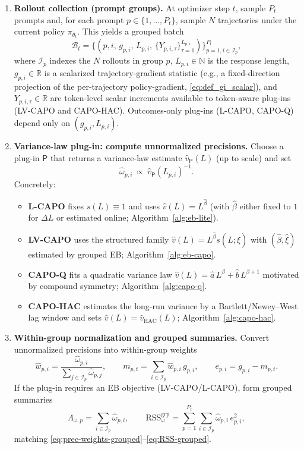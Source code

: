 \begin{enumerate}
  \item \textbf{Rollout collection (prompt groups).} At optimizer step $t$, sample $P_t$ prompts and, for each prompt $p\in\{1,\dots,P_t\}$, sample $N$ trajectories under the current policy $\pi_{\theta_t}$. This yields a grouped batch
  \[
  \mathcal B_t=\big\{(p,i,\,g_{p,i},\,L_{p,i},\,\{Y_{p,i,\tau}\}_{\tau=1}^{L_{p,i}})\big\}_{p=1,i\in\mathcal I_p}^{P_t},
  \]
  where $\mathcal I_p$ indexes the $N$ rollouts in group $p$, $L_{p,i}\in\mathbb N$ is the response length, $g_{p,i}\in\mathbb R$ is a scalarized trajectory-gradient statistic (e.g., a fixed-direction projection of the per-trajectory policy-gradient, \eqref{eq:def_gi_scalar}), and $Y_{p,i,\tau}\in\mathbb R$ are token-level scalar increments available to token-aware plug-ins (LV-CAPO and CAPO-HAC). Outcomes-only plug-ins (L-CAPO, CAPO-Q) depend only on $(g_{p,i},L_{p,i})$.

  \item \textbf{Variance-law plug-in: compute unnormalized precisions.} Choose a plug-in $\mathsf{P}$ that returns a variance-law estimate $\widehat v_{\mathsf{P}}(L)$ (up to scale) and set
  \[
  \widehat\omega_{p,i}\ \propto\ \widehat v_{\mathsf{P}}(L_{p,i})^{-1}.
  \]
  Concretely:
  \begin{itemize}
    \item \textbf{L-CAPO} fixes $s(L)\equiv 1$ and uses $\widehat v(L)=L^{\widehat\beta}$ (with $\widehat\beta$ either fixed to $1$ for $\Delta L$ or estimated online; Algorithm~\ref{alg:eb-lite}).
    \item \textbf{LV-CAPO} uses the structured family $\widehat v(L)=L^{\widehat\beta}s(L;\widehat\xi)$ with $(\widehat\beta,\widehat\xi)$ estimated by grouped EB; Algorithm~\ref{alg:eb-capo}.
    \item \textbf{CAPO-Q} fits a quadratic variance law $\widehat v(L)=\widehat a\,L^{\beta}+\widehat b\,L^{\beta+1}$ motivated by compound symmetry; Algorithm~\ref{alg:capo-q}.
    \item \textbf{CAPO-HAC} estimates the long-run variance by a Bartlett/Newey--West lag window and sets $\widehat v(L)=\widehat v_{\mathrm{HAC}}(L)$; Algorithm~\ref{alg:capo-hac}.
  \end{itemize}

  \item \textbf{Within-group normalization and grouped summaries.} Convert unnormalized precisions into within-group weights
  \[
  \widehat w_{p,i}=\frac{\widehat\omega_{p,i}}{\sum_{j\in\mathcal I_p}\widehat\omega_{p,j}},\qquad
  m_{p,t}=\sum_{i\in\mathcal I_p}\widehat w_{p,i}\,g_{p,i},\qquad
  e_{p,i}=g_{p,i}-m_{p,t}.
  \]
  If the plug-in requires an EB objective (LV-CAPO/L-CAPO), form grouped summaries
  \[
  \Lambda_{\omega,p}=\sum_{i\in\mathcal I_p}\widehat\omega_{p,i},\qquad
  \mathrm{RSS}_{\omega}^{\mathrm{grp}}=\sum_{p=1}^{P_t}\sum_{i\in\mathcal I_p}\widehat\omega_{p,i}\,e_{p,i}^2,
  \]
  matching \eqref{eq:prec-weights-grouped}--\eqref{eq:RSS-grouped}.


\end{enumerate}
